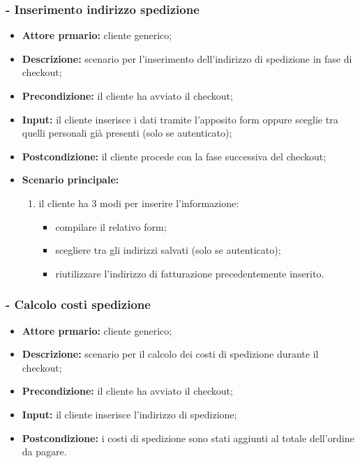 \subsubsection{ - Inserimento indirizzo spedizione}
\begin{itemize}
    \item \textbf{Attore prmario:} cliente generico;
    \item \textbf{Descrizione:} scenario per l'inserimento dell'indirizzo di spedizione in fase di checkout;
    \item \textbf{Precondizione:} il cliente ha avviato il checkout;
    \item \textbf{Input:} il cliente inserisce i dati tramite l'apposito form oppure sceglie tra quelli personali già presenti (solo se autenticato);
    \item \textbf{Postcondizione:} il cliente procede con la fase successiva del checkout;
    \item \textbf{Scenario principale:}
          \begin{enumerate}
              \item il cliente ha 3 modi per inserire l'informazione:
                    \begin{itemize}
                        \item compilare il relativo form;
                        \item scegliere tra gli indirizzi salvati (solo se autenticato);
                        \item riutilizzare l'indirizzo di fatturazione precedentemente inserito.
                    \end{itemize}
          \end{enumerate}
\end{itemize}

\stepsubUserCase
\subsubsection{ - Calcolo costi spedizione}
\begin{itemize}
    \item \textbf{Attore prmario:} cliente generico;
    \item \textbf{Descrizione:} scenario per il calcolo dei costi di spedizione durante il checkout;
    \item \textbf{Precondizione:} il cliente ha avviato il checkout;
    \item \textbf{Input:} il cliente inserisce l'indirizzo di spedizione;
    \item \textbf{Postcondizione:} i costi di spedizione sono stati aggiunti al totale dell'ordine da pagare.
\end{itemize}


